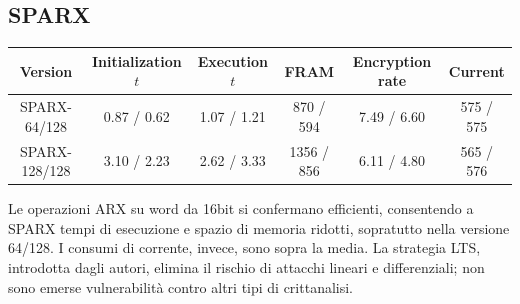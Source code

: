 \documentclass[target=bach,aauheader=,style=]{thud}
\begin{document}
		\subsection{SPARX}
		\begin{center}
			\begin{tabular}{|c| *{5}{c|}}
				\hline
				\textbf{Version} & \textbf{Initialization} $t$& \textbf{Execution} $t$ & \textbf{FRAM} & \textbf{Encryption rate} & \textbf{Current} \\
				\hline
				SPARX-64/128 & \textcolor{Mahogany}{0.87} / \textcolor{OliveGreen}{0.62} & \textcolor{Mahogany}{1.07} / \textcolor{OliveGreen}{1.21} & \textcolor{Mahogany}{870} / \textcolor{OliveGreen}{594} & \textcolor{Mahogany}{7.49} / \textcolor{OliveGreen}{6.60} & \textcolor{Mahogany}{575} / \textcolor{OliveGreen}{575} \\
				\hline
				SPARX-128/128 & \textcolor{Mahogany}{3.10} / \textcolor{OliveGreen}{2.23} & \textcolor{Mahogany}{2.62} / \textcolor{OliveGreen}{3.33} & \textcolor{Mahogany}{1356} / \textcolor{OliveGreen}{856} & \textcolor{Mahogany}{6.11} / \textcolor{OliveGreen}{4.80} & \textcolor{Mahogany}{565} / \textcolor{OliveGreen}{576} \\
				\hline
			\end{tabular}
		\end{center}
		
		Le operazioni ARX su word da 16bit si confermano efficienti, consentendo a SPARX tempi di esecuzione e spazio di memoria ridotti, sopratutto nella versione 64/128. I consumi di corrente, invece, sono sopra la media. La strategia LTS, introdotta dagli autori, elimina il rischio di attacchi lineari e differenziali; non sono emerse vulnerabilità contro altri tipi di crittanalisi.
\end{document}
